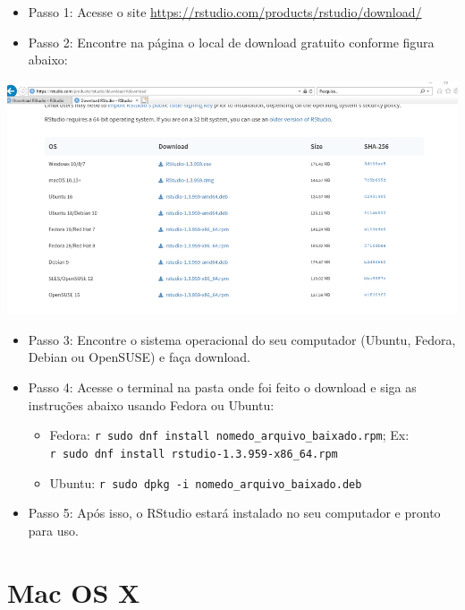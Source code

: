 \documentclass[
  brazil,
]{book}
\providecommand{\tightlist}{%
  \setlength{\itemsep}{0pt}\setlength{\parskip}{0pt}}
\begin{document}
\begin{itemize}
\tightlist
\item
  Passo 1: Acesse o site \url{https://rstudio.com/products/rstudio/download/}\\
\item
  Passo 2: Encontre na página o local de download gratuito conforme figura abaixo:
\end{itemize}

\includegraphics[width=13.54in]{img/inst_1_rstudio}

\begin{itemize}
\tightlist
\item
  Passo 3: Encontre o sistema operacional do seu computador (Ubuntu, Fedora, Debian ou OpenSUSE) e faça download.\\
\item
  Passo 4: Acesse o terminal na pasta onde foi feito o download e siga as instruções abaixo usando Fedora ou Ubuntu:

  \begin{itemize}
  \tightlist
  \item
    Fedora: \texttt{r\ sudo\ dnf\ install\ nomedo\_arquivo\_baixado.rpm}; Ex: \texttt{r\ sudo\ dnf\ install\ rstudio-1.3.959-x86\_64.rpm}
  \item
    Ubuntu: \texttt{r\ sudo\ dpkg\ -i\ nomedo\_arquivo\_baixado.deb}\\
  \end{itemize}
\item
  Passo 5: Após isso, o RStudio estará instalado no seu computador e pronto para uso.
\end{itemize}

\hypertarget{mac-os-x}{%
\section{Mac OS X}\label{mac-os-x}}
\end{document}
